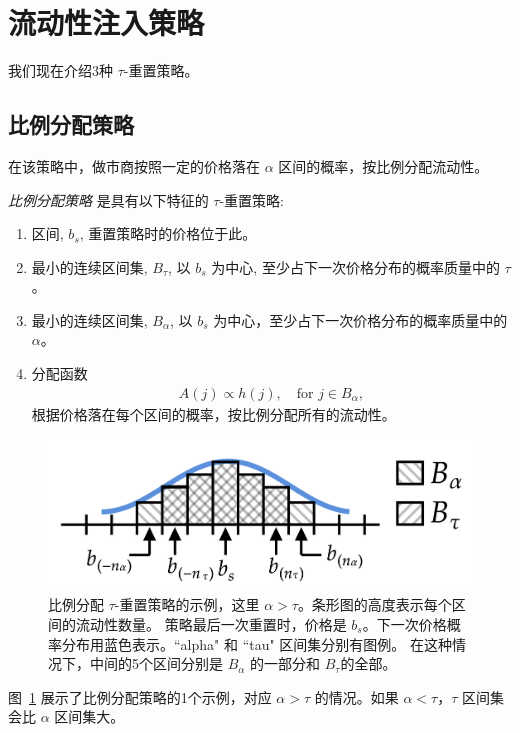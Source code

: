 \documentclass[sigconf, dvipsnames]{acmart}
\newcommand{\dcp}[1]{\textcolor{blue}{{\scriptsize{David:}}#1}}
\begin{document}
\section{流动性注入策略}\label{sec:strats}
\quad 我们现在介绍3种 $\tau$-重置策略。

\subsection{比例分配策略}\label{sub:prop-adapt}
\quad 在该策略中，做市商按照一定的价格落在 $\alpha$ 区间的概率，按比例分配流动性。
\begin{definition}
\textit{比例分配策略} 是具有以下特征的 $\tau$-重置策略:
\begin{enumerate}
    \item 区间, $b_s$, 重置策略时的价格位于此。
    \item 最小的连续区间集, $B_{\tau}$, 以 $b_s$ 为中心, 至少占下一次价格分布的概率质量中的 $\tau$。
    \item 最小的连续区间集, $B_{\alpha}$, 以 $b_s$ 为中心，至少占下一次价格分布的概率质量中的 $\alpha$。
    \item 分配函数
    \begin{align}
        A(j) \propto  h(j), \quad \text{for } j\in B_{\alpha},
    \end{align}
    根据价格落在每个区间的概率，按比例分配所有的流动性。
\end{enumerate}
\end{definition}


\begin{figure}
    \centering
    \includegraphics[width=\linewidth]{img/alpha_tau_ex.png}
    \caption{比例分配 $\tau$-重置策略的示例，这里 $\alpha > \tau$。条形图的高度表示每个区间的流动性数量。
    策略最后一次重置时，价格是 $b_s$。下一次价格概率分布用蓝色表示。``alpha" 和 ``tau" 区间集分别有图例。
    在这种情况下，中间的5个区间分别是 $B_{\alpha}$ 的一部分和 $B_{\tau}$的全部。
    \label{fig:alpha_tau_ex}}
\end{figure}
图~\ref{fig:alpha_tau_ex} 展示了比例分配策略的1个示例，对应 $\alpha > \tau$ 的情况。如果 $\alpha < \tau$，$\tau$ 区间集会比 $\alpha$ 区间集大。
\end{document}
